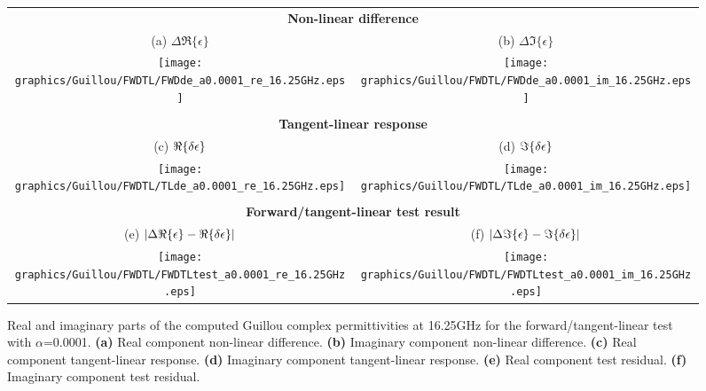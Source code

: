 \begin{figure}[htp]
  \centering
  \begin{tabular}{c c}
    \multicolumn{2}{c}{\sffamily\textbf{Non-linear difference}}\\
    \textsf{(a)} $\Delta\Re\{\epsilon\}$ &
    \textsf{(b)} $\Delta\Im\{\epsilon\}$ \\
    \hspace{1.0em}\texttt{[image: graphics/Guillou/FWDTL/FWDde\_a0.0001\_re\_16.25GHz.eps]} &
    \hspace{1.0em}\texttt{[image: graphics/Guillou/FWDTL/FWDde\_a0.0001\_im\_16.25GHz.eps]} \\\\
    \multicolumn{2}{c}{\sffamily\textbf{Tangent-linear response}}\\
    \textsf{(c)} $\Re\{\delta\epsilon\}$ &
    \textsf{(d)} $\Im\{\delta\epsilon\}$ \\
    \hspace{1.0em}\texttt{[image: graphics/Guillou/FWDTL/TLde\_a0.0001\_re\_16.25GHz.eps]} &
    \hspace{1.0em}\texttt{[image: graphics/Guillou/FWDTL/TLde\_a0.0001\_im\_16.25GHz.eps]} \\\\
    \multicolumn{2}{c}{\sffamily\textbf{Forward/tangent-linear test result}}\\
    \textsf{(e)} $|\Delta\Re\{\epsilon\} - \Re\{\delta\epsilon\}|$ &
    \textsf{(f)} $|\Delta\Im\{\epsilon\} - \Im\{\delta\epsilon\}|$ \\
    \texttt{[image: graphics/Guillou/FWDTL/FWDTLtest\_a0.0001\_re\_16.25GHz.eps]} & 
    \texttt{[image: graphics/Guillou/FWDTL/FWDTLtest\_a0.0001\_im\_16.25GHz.eps]}
  \end{tabular}
  \caption{Real and imaginary parts of the computed Guillou complex permittivities at 16.25GHz for the forward/tangent-linear test with $\alpha$=0.0001. \textbf{(a)} Real component non-linear difference.  \textbf{(b)} Imaginary component non-linear difference. \textbf{(c)} Real component tangent-linear response. \textbf{(d)} Imaginary component tangent-linear response. \textbf{(e)} Real component test residual. \textbf{(f)} Imaginary component test residual.}
  \label{fig:fwdtl_a0.0001_guillou}
\end{figure}


